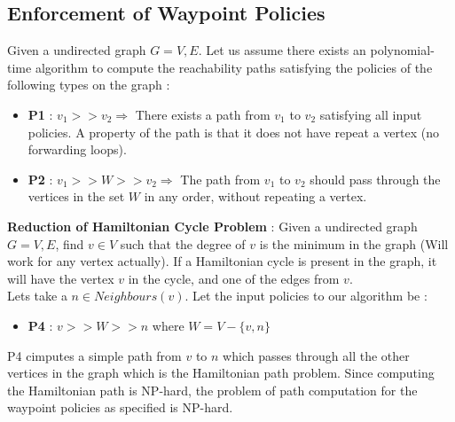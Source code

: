 \documentclass[]{sig}
\begin{document}
 \subsection{Enforcement of Waypoint Policies}
 Given a undirected graph $G={V,E}$. Let us assume there exists an polynomial-time algorithm to compute the reachability paths satisfying the policies of the following types on the graph : \\
 \begin{itemize} 
 	\item \textbf{P1} : $v_1 >> v_2 \Rightarrow$ There exists a path from $v_1$ to $v_2$ satisfying all input policies. A property of the path is that it does not have repeat a vertex (no forwarding loops).
 	\item \textbf{P2} : $v_1 >> W >> v_2 \Rightarrow$ The path from $v_1$ to $v_2$  should pass through the vertices in the set $W$ in any order, without repeating a vertex.
 \end{itemize}
 \textbf{Reduction of Hamiltonian Cycle Problem} : Given a undirected graph $G={V,E}$, find $v \in V$ such that the degree of $v$ is the minimum in the graph (Will work for any vertex actually). If a Hamiltonian cycle is present in the graph, it will have the vertex $v$ in the cycle, and one of the edges from $v$.  \\
 Lets take a $n \in Neighbours(v)$. Let the input policies to our algorithm be : 
 \begin{itemize}
 	\item \textbf{P4} : $v >> W >> n$ where $W = V - \{v,n\} $ 
 \end{itemize}
P4 cimputes a simple path from $v$ to $n$ which passes through all the other vertices in the graph which is the Hamiltonian path problem. Since computing the Hamiltonian path is NP-hard, the problem of path computation for the waypoint policies as specified is NP-hard. 
 
\end{document}
